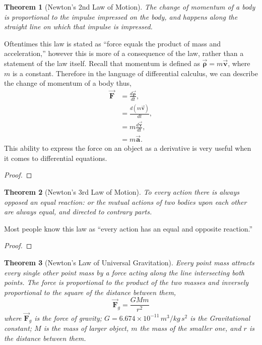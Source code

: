 \documentclass[letterpaper, 12pt]{amsart}
\newcommand{\bvec}[1]{{\vec{\mathbf{#1}}}}			%
\newtheorem{thm}{Theorem}[section]					%
\theoremstyle{definition}  							%
\begin{document}
			\begin{thm}[Newton's 2nd Law of Motion]
			The change of momentum of a body is proportional to the impulse impressed on the body, and happens along the straight line on which that impulse is impressed.
			\end{thm}
			Oftentimes this law is stated as ``force equals the product of mass and acceleration,'' however this is more of a consequence of the law, rather than a statement of the law itself.
			Recall that momentum is defined as $\vec{\bm{\rho}} = m \bvec{v}$, where $m$ is a constant. 
			Therefore in the language of differential calculus, we can describe the change of momentum of a body thus,
				\begin{align*}
					\bvec{F} &= \frac{d\vec{\bm{\rho}}}{dt}, \\
					&= \frac{d(m\bvec{v})}{dt}, \\
					&= m\frac{d\bvec{v}}{dt}, \\
					&= m \bvec{a}.
				\end{align*}
			This ability to express the force on an object as a derivative is very useful when it comes to differential equations.

			\begin{proof}
			\end{proof}

			\begin{thm}[Newton's 3rd Law of Motion]
			To every action there is always opposed an equal reaction: or the mutual actions of two bodies upon each other are always equal, and directed to contrary parts.
			\end{thm}
			Most people know this law as ``every action has an equal and opposite reaction.''

			\begin{proof}
			\end{proof}

			\begin{thm}[Newton's Law of Universal Gravitation]
			Every point mass attracts every single other point mass by a force acting along the line intersecting both points. 
			The force is proportional to the product of the two masses and inversely proportional to the square of the distance between them, $$\bvec{F}_{g} = \frac{GMm}{r^2}$$ where $\bvec{F}_{g}$ is the force of gravity; $G = 6.674 \times 10^{-11} \, m^3/kg \, s^2$ is the Gravitational constant; $M$ is the mass of larger object, $m$ the mass of the smaller one, and $r$ is the distance between them.
			\end{thm}
\end{document}
